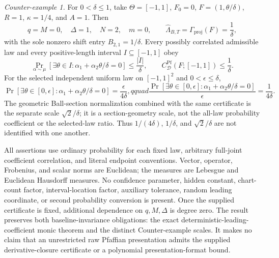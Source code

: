 \begin{theorem}
\emph{Counter-example 1.} For $0<\delta\leq1$, take $\Theta=[-1,1]$, $F_0=0$,
$F=(1,\theta/\delta)$, $R=1$, $\kappa=1/4$, and $A=1$. Then
\begin{equation}
\label{eq:main-display-015}
q=M=0,\quad \Delta=1,\quad N=2,\quad m=0,
\qquad \widehat\Lambda_{B,T}=\Gamma_{\mathrm{proj}}(F)=\frac1\delta,
\end{equation}
with the sole nonzero shift entry $B_{2,1}=1/\delta$. Every possibly correlated admissible law and every
positive-length interval $I\subseteq[-1,1]$ obey
\begin{equation}
\label{eq:main-display-016}
\Pr_{\alpha\sim\mu}[\exists\theta\in I:\alpha_1+\alpha_2\theta/\delta=0]\leq\frac{|I|}{\delta},
\qquad C^{\mathrm{Pf}}_{\mathcal D}(F;[-1,1])\leq\frac1\delta.
\end{equation}
For the selected independent uniform law on $[-1,1]^2$ and $0<\epsilon\leq\delta$,
\begin{equation}
\label{eq:main-display-017}
\Pr[\exists\theta\in[0,\epsilon]:\alpha_1+\alpha_2\theta/\delta=0]
=\frac{\epsilon}{4\delta},qquad
\frac{\Pr[\exists\theta\in[0,\epsilon]:\alpha_1+\alpha_2\theta/\delta=0]}{\epsilon}
=\frac1{4\delta}.
\end{equation}
The geometric Ball-section normalization combined with the same certificate is the separate scale
$\sqrt2/\delta$; it is a section-geometry scale, not the all-law probability coefficient or the selected-law
ratio. Thus $1/(4\delta)$, $1/\delta$, and $\sqrt2/\delta$ are not identified with one another.

All assertions use ordinary probability for each fixed law, arbitrary full-joint coefficient correlation,
and literal endpoint conventions. Vector, operator, Frobenius, and scalar norms are Euclidean; the measures
are Lebesgue and Euclidean Hausdorff measures. No confidence parameter, hidden constant, chart-count factor,
interval-location factor, auxiliary tolerance, random leading coordinate, or second probability conversion is
present. Once the supplied certificate is fixed, additional dependence on $q,M,\Delta$ is degree zero. The result preserves both
baseline-invariance obligations: the exact deterministic-leading-coefficient monic theorem and the distinct
Counter-example scales. It makes no claim that an unrestricted raw Pfaffian presentation admits the supplied
derivative-closure certificate or a polynomial presentation-format bound.
\end{theorem}
